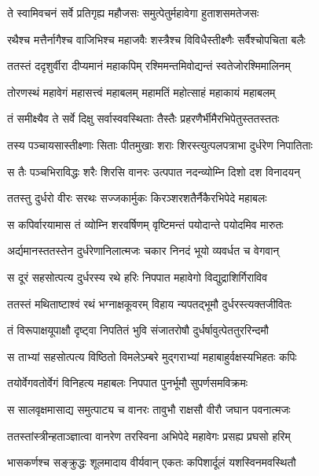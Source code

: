 \twolineshloka
{ते स्वामिवचनं सर्वे प्रतिगृह्य महौजसः}
{समुत्पेतुर्महावेगा हुताशसमतेजसः} %

\twolineshloka
{रथैश्च मत्तैर्नागैश्च वाजिभिश्च महाजवैः}
{शस्त्रैश्च विविधैस्तीक्ष्णैः सर्वैश्चोपचिता बलैः} %

\twolineshloka
{ततस्तं ददृशुर्वीरा दीप्यमानं महाकपिम्}
{रश्मिमन्तमिवोद्यन्तं स्वतेजोरश्मिमालिनम्} %

\twolineshloka
{तोरणस्थं महावेगं महासत्त्वं महाबलम्}
{महामतिं महोत्साहं महाकायं महाबलम्} %

\twolineshloka
{तं समीक्ष्यैव ते सर्वे दिक्षु सर्वास्ववस्थिताः}
{तैस्तैः प्रहरणैर्भीमैरभिपेतुस्ततस्ततः} %

\twolineshloka
{तस्य पञ्चायसास्तीक्ष्णाः सिताः पीतमुखाः शराः}
{शिरस्त्युत्पलपत्राभा दुर्धरेण निपातिताः} %

\twolineshloka
{स तैः पञ्चभिराविद्धः शरैः शिरसि वानरः}
{उत्पपात नदन्व्योम्नि दिशो दश विनादयन्} %

\twolineshloka
{ततस्तु दुर्धरो वीरः सरथः सज्जकार्मुकः}
{किरञ्शरशतैर्नैकैरभिपेदे महाबलः} %

\twolineshloka
{स कपिर्वारयामास तं व्योम्नि शरवर्षिणम्}
{वृष्टिमन्तं पयोदान्ते पयोदमिव मारुतः} %

\twolineshloka
{अर्द्यमानस्ततस्तेन दुर्धरेणानिलात्मजः}
{चकार निनदं भूयो व्यवर्धत च वेगवान्} %

\twolineshloka
{स दूरं सहसोत्पत्य दुर्धरस्य रथे हरिः}
{निपपात महावेगो विद्युद्राशिर्गिराविव} %

\twolineshloka
{ततस्तं मथिताष्टाश्वं रथं भग्नाक्षकूवरम्}
{विहाय न्यपतद्भूमौ दुर्धरस्त्यक्तजीवितः} %

\twolineshloka
{तं विरूपाक्षयूपाक्षौ दृष्ट्वा निपतितं भुवि}
{संजातरोषौ दुर्धर्षावुत्पेततुररिन्दमौ} %

\twolineshloka
{स ताभ्यां सहसोत्पत्य विष्ठितो विमलेऽम्बरे}
{मुद्गराभ्यां महाबाहुर्वक्षस्यभिहतः कपिः} %

\twolineshloka
{तयोर्वेगवतोर्वेगं विनिहत्य महाबलः}
{निपपात पुनर्भूमौ सुपर्णसमविक्रमः} %

\twolineshloka
{स सालवृक्षमासाद्य समुत्पाट्य च वानरः}
{तावुभौ राक्षसौ वीरौ जघान पवनात्मजः} %

\twolineshloka
{ततस्तांस्त्रीन्हताञ्ज्ञात्वा वानरेण तरस्विना}
{अभिपेदे महावेगः प्रसह्य प्रघसो हरिम्} %

\twolineshloka
{भासकर्णश्च सङ्क्रुद्धः शूलमादाय वीर्यवान्}
{एकतः कपिशार्दूलं यशस्विनमवस्थितौ} %


